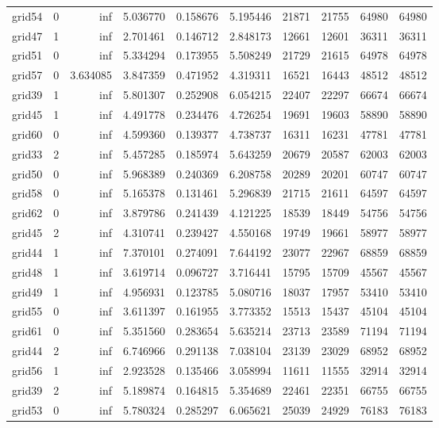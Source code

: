 \begin{longtable}{|l|r|r|r|r|r|r|r|r|r|}
grid54 & 0 & inf & 5.036770 & 0.158676 & 5.195446 & 21871 & 21755 & 64980 & 64980 \\
grid47 & 1 & inf & 2.701461 & 0.146712 & 2.848173 & 12661 & 12601 & 36311 & 36311 \\
grid51 & 0 & inf & 5.334294 & 0.173955 & 5.508249 & 21729 & 21615 & 64978 & 64978 \\
grid57 & 0 & 3.634085 & 3.847359 & 0.471952 & 4.319311 & 16521 & 16443 & 48512 & 48512 \\
grid39 & 1 & inf & 5.801307 & 0.252908 & 6.054215 & 22407 & 22297 & 66674 & 66674 \\
grid45 & 1 & inf & 4.491778 & 0.234476 & 4.726254 & 19691 & 19603 & 58890 & 58890 \\
grid60 & 0 & inf & 4.599360 & 0.139377 & 4.738737 & 16311 & 16231 & 47781 & 47781 \\
grid33 & 2 & inf & 5.457285 & 0.185974 & 5.643259 & 20679 & 20587 & 62003 & 62003 \\
grid50 & 0 & inf & 5.968389 & 0.240369 & 6.208758 & 20289 & 20201 & 60747 & 60747 \\
grid58 & 0 & inf & 5.165378 & 0.131461 & 5.296839 & 21715 & 21611 & 64597 & 64597 \\
grid62 & 0 & inf & 3.879786 & 0.241439 & 4.121225 & 18539 & 18449 & 54756 & 54756 \\
grid45 & 2 & inf & 4.310741 & 0.239427 & 4.550168 & 19749 & 19661 & 58977 & 58977 \\
grid44 & 1 & inf & 7.370101 & 0.274091 & 7.644192 & 23077 & 22967 & 68859 & 68859 \\
grid48 & 1 & inf & 3.619714 & 0.096727 & 3.716441 & 15795 & 15709 & 45567 & 45567 \\
grid49 & 1 & inf & 4.956931 & 0.123785 & 5.080716 & 18037 & 17957 & 53410 & 53410 \\
grid55 & 0 & inf & 3.611397 & 0.161955 & 3.773352 & 15513 & 15437 & 45104 & 45104 \\
grid61 & 0 & inf & 5.351560 & 0.283654 & 5.635214 & 23713 & 23589 & 71194 & 71194 \\
grid44 & 2 & inf & 6.746966 & 0.291138 & 7.038104 & 23139 & 23029 & 68952 & 68952 \\
grid56 & 1 & inf & 2.923528 & 0.135466 & 3.058994 & 11611 & 11555 & 32914 & 32914 \\
grid39 & 2 & inf & 5.189874 & 0.164815 & 5.354689 & 22461 & 22351 & 66755 & 66755 \\
grid53 & 0 & inf & 5.780324 & 0.285297 & 6.065621 & 25039 & 24929 & 76183 & 76183 \\

\end{longtable}
